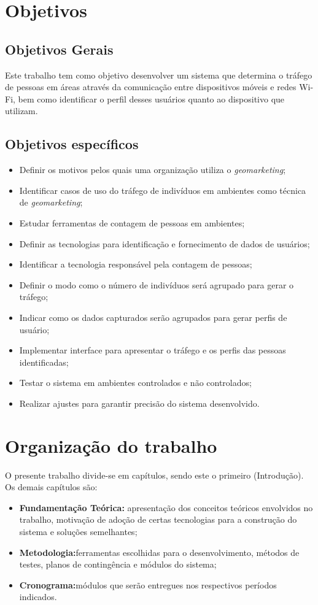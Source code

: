 \section{Objetivos}
\label{objetivos}

\subsection{Objetivos Gerais}
Este trabalho tem como objetivo desenvolver um sistema que determina o tráfego de pessoas em áreas através da comunicação
entre dispositivos móveis e redes Wi-Fi, bem como identificar o perfil desses usuários quanto ao dispositivo que utilizam.

\subsection{Objetivos específicos}
\begin{itemize}
  \item Definir os motivos pelos quais uma organização utiliza o \emph{geomarketing};
  \item Identificar casos de uso do tráfego de indivíduos em ambientes como técnica
  de \emph{geomarketing};
  \item Estudar ferramentas de contagem de pessoas em ambientes;
  \item Definir as tecnologias para identificação e fornecimento de dados de usuários;
  \item Identificar a tecnologia responsável pela contagem de pessoas;
  \item Definir o modo como o número de indivíduos será agrupado para gerar o tráfego;
  \item Indicar como os dados capturados serão agrupados para gerar perfis de usuário;
  \item Implementar interface para apresentar o tráfego e os perfis das pessoas identificadas;
  \item Testar o sistema em ambientes controlados e não controlados;
  \item Realizar ajustes para garantir precisão do sistema desenvolvido.
\end{itemize}

\section{Organização do trabalho}
O presente trabalho divide-se em capítulos, sendo este o primeiro (Introdução). Os demais capítulos são:

\begin{itemize}
  \item \textbf{Fundamentação Teórica:} apresentação dos conceitos teóricos envolvidos no trabalho, motivação de
  adoção de certas tecnologias para a construção do sistema e soluções semelhantes;
  \item \textbf{Metodologia:}ferramentas escolhidas para o desenvolvimento, métodos de testes, planos de contingência e módulos
  do sistema;
  \item \textbf{Cronograma:}módulos que serão entregues nos respectivos períodos indicados.
\end{itemize}
